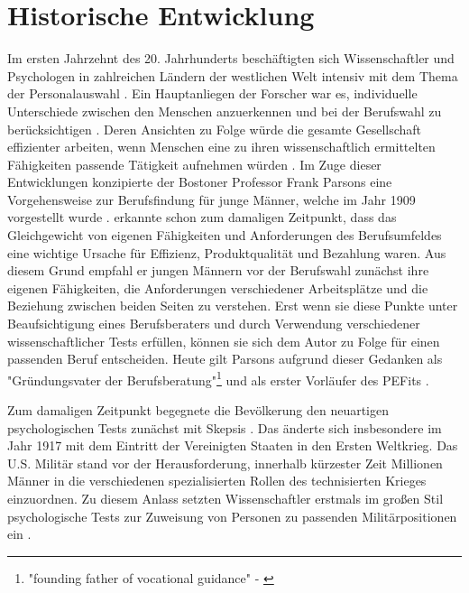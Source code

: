 \section{Historische Entwicklung}
\label{ch:personEnvironmentFit:historisches}
Im ersten Jahrzehnt des 20. Jahrhunderts beschäftigten sich Wissenschaftler und Psychologen in zahlreichen Ländern der westlichen Welt intensiv mit dem Thema der Personalauswahl \cite[S. 1]{salgado:2001}. Ein Hauptanliegen der Forscher war es, individuelle Unterschiede zwischen den Menschen anzuerkennen und bei der Berufswahl zu berücksichtigen \cite[S. 2ff.]{stern:1900}. Deren Ansichten zu Folge würde die gesamte Gesellschaft effizienter arbeiten, wenn Menschen eine zu ihren wissenschaftlich ermittelten Fähigkeiten passende Tätigkeit aufnehmen würden \cite[S.2]{kevles:1968}\cite[S. 3]{parsons:1909}. Im Zuge dieser Entwicklungen konzipierte der Bostoner Professor Frank Parsons eine Vorgehensweise zur Berufsfindung für junge Männer, welche im Jahr 1909 vorgestellt wurde \cite[S. 1]{su:2015}. \textcite[S. 5ff.]{parsons:1909} erkannte schon zum damaligen Zeitpunkt, dass das Gleichgewicht von eigenen Fähigkeiten und Anforderungen des Berufsumfeldes eine wichtige Ursache für Effizienz, Produktqualität und Bezahlung waren. Aus diesem Grund empfahl er jungen Männern vor der Berufswahl zunächst ihre eigenen Fähigkeiten, die Anforderungen verschiedener Arbeitsplätze und die Beziehung zwischen beiden Seiten zu verstehen. Erst wenn sie diese Punkte unter Beaufsichtigung eines Berufsberaters und durch Verwendung verschiedener wissenschaftlicher Tests erfüllen, können sie sich dem Autor zu Folge für einen passenden Beruf entscheiden. Heute gilt Parsons aufgrund dieser Gedanken als "Gründungsvater der Berufsberatung"\footnote{"founding father of vocational guidance" - \textcite[S. 3, Z. 29]{porfeli:2009}} \cite[S. 3, Z. 29]{porfeli:2009} und als erster Vorläufer des \acp{PEFit} \cite[S. 2]{edwards:2008}.

Zum damaligen Zeitpunkt begegnete die Bevölkerung den neuartigen psychologischen Tests zunächst mit Skepsis \cite[S. 2]{kevles:1968}. Das änderte sich insbesondere im Jahr 1917 mit dem Eintritt der Vereinigten Staaten in den Ersten Weltkrieg. Das U.S. Militär stand vor der Herausforderung, innerhalb kürzester Zeit Millionen Männer in die verschiedenen spezialisierten Rollen des technisierten Krieges einzuordnen. Zu diesem Anlass setzten Wissenschaftler erstmals im großen Stil psychologische Tests zur Zuweisung von Personen zu passenden Militärpositionen ein \cite[S. 2ff.]{kevles:1968}. 

